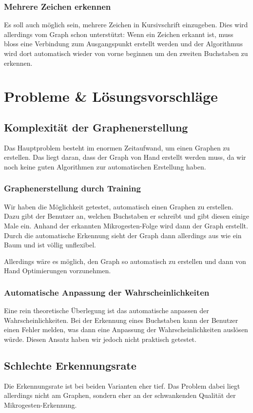 \subsubsection{Mehrere Zeichen erkennen}
Es soll auch möglich sein, mehrere Zeichen in Kursivschrift einzugeben. Dies wird allerdings vom Graph schon unterstützt: Wenn ein Zeichen erkannt ist, muss bloss eine Verbindung zum Ausgangspunkt erstellt werden und der Algorithmus wird dort automatisch wieder von vorne beginnen um den zweiten Buchstaben zu erkennen.

\section{Probleme \& Lösungsvorschläge}
\subsection{Komplexität der Graphenerstellung}
Das Hauptproblem besteht im enormen Zeitaufwand, um einen Graphen zu erstellen. Das liegt daran, dass der Graph von Hand erstellt werden muss, da wir noch keine guten Algorithmen zur automatischen Erstellung haben.

\subsubsection{Graphenerstellung durch Training}
Wir haben die Möglichkeit getestet, automatisch einen Graphen zu erstellen. Dazu gibt der Benutzer an, welchen Buchstaben er schreibt und gibt diesen einige Male ein. Anhand der erkannten Mikrogesten-Folge wird dann der Graph erstellt. Durch die automatische Erkennung sieht der Graph dann allerdings aus wie ein Baum und ist völlig unflexibel. 

Allerdings wäre es möglich, den Graph so automatisch zu erstellen und dann von Hand Optimierungen vorzunehmen.

\subsubsection{Automatische Anpassung der Wahrscheinlichkeiten}
Eine rein theoretische Überlegung ist das automatische anpassen der Wahrscheinlichkeiten. Bei der Erkennung eines Buchstaben kann der Benutzer einen Fehler melden, was dann eine Anpassung der Wahrscheinlichkeiten auslösen würde. 
Diesen Ansatz haben wir jedoch nicht praktisch getestet.

\subsection{Schlechte Erkennungsrate}
Die Erkennungsrate ist bei beiden Varianten eher tief. Das Problem dabei liegt allerdings nicht am Graphen, sondern eher an der schwankenden Qualität der Mikrogesten-Erkennung.

